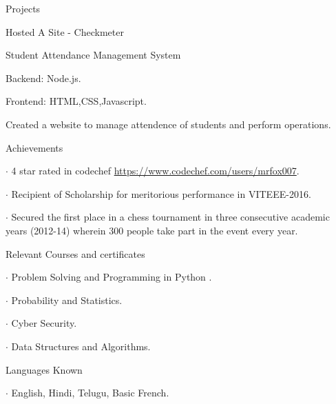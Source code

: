 \documentclass{resume} %
\begin{document}
\begin{rSection}{Projects}
\begin{rSubsection}{ Hosted A Site - Checkmeter}{}{}
\end{rSubsection}

\begin{rSubsection}{ Student Attendance Management System}{}{}

    \item Backend: Node.js.
    \item Frontend: HTML,CSS,Javascript.
    \item Created a website to manage attendence of students and perform operations.

\end{rSubsection}

\end{rSection}



\begin{rSection}{Achievements} \itemsep -5pt
    \item $\cdot$ 4 star rated in codechef \url{https://www.codechef.com/users/mrfox007}.
    \item $\cdot$ Recipient of Scholarship for meritorious performance in VITEEE-2016.
    \item $\cdot$ Secured the first place in a chess tournament in three consecutive academic years (2012-14) wherein \phantom{x} 300 people take part in the event every year.
\end{rSection}

\begin{rSection}{Relevant Courses and certificates} \itemsep -4pt \topmargin -50pt
    \item $\cdot$ Problem Solving and Programming in Python .
    \item $\cdot$ Probability and Statistics.
    \item $\cdot$ Cyber Security.
    \item $\cdot$ Data Structures and Algorithms.
\end{rSection}

\begin{rSection}{Languages Known} \itemsep -4pt
    \item $\cdot$ English, Hindi, Telugu, Basic French.
\end{rSection}
\end{document}
